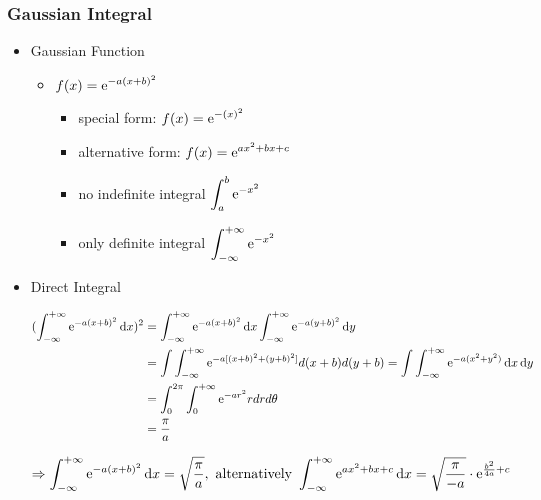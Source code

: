 \subsubsection{Gaussian Integral} \label{MATH_Cal_GaussianInt}
\begin{itemize}
\item Gaussian Function
	\begin{itemize}
	\item $\displaystyle f(x) = {\rm e}^{-a(x+b)^2}$
		\begin{itemize}
		\item special form: $\displaystyle f(x) = {\rm e}^{-(x)^2}$
		\item alternative form: $\displaystyle f(x) = {\rm e}^{ax^2+bx+c}$
		\item no indefinite integral $\displaystyle \int_a^b {\rm e}^{-x^2}$
		\item only definite integral $\displaystyle \int_{-\infty}^{+\infty} {\rm e}^{-x^2}$
		\end{itemize}
	\end{itemize}
\item Direct Integral
	\begin{itemize}
	\Item \begin{align*}\displaystyle (\int^{+\infty}_{-\infty} {\rm e}^{-a(x+b)^2}\mathop{}\!\mathrm{d} x)^2 &= \int^{+\infty}_{-\infty} {\rm e}^{-a(x+b)^2}\mathop{}\!\mathrm{d} x\int^{+\infty}_{-\infty} {\rm e}^{-a(y+b)^2}\mathop{}\!\mathrm{d} y \\ &= \int\int^{+\infty}_{-\infty} {\rm e}^{-a[(x+b)^2  + (y+b)^2]}d(x+b)d(y+b) = \int\int^{+\infty}_{-\infty} {\rm e}^{-a(x^2+y^2)}\mathop{}\!\mathrm{d} x\mathop{}\!\mathrm{d} y \\ &= \int_0^{2\pi}\int_0^{+\infty} {\rm e}^{-ar^2}rdrd\theta  \\ &= \frac \pi a \end{align*}
	
	$\displaystyle \Rightarrow \int^{+\infty}_{-\infty} {\rm e}^{-a(x+b)^2}\mathop{}\!\mathrm{d} x = \sqrt{\frac \pi a}, \text{ alternatively } \int^{+\infty}_{-\infty} {\rm e}^{ax^2+bx+c}\mathop{}\!\mathrm{d} x = \sqrt{\frac {\pi} {-a}} \cdot {\rm e}^{\frac {b^2}{4a} + c}$
	\end{itemize}


\end{itemize}

